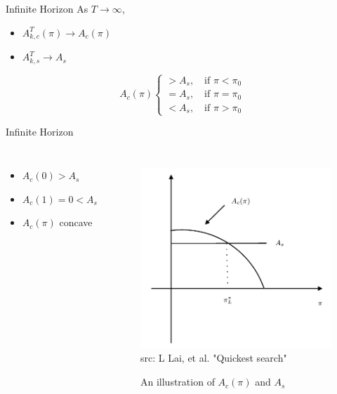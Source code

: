 \documentclass[xcolor={svgnames}]{beamer}
\begin{document}
\begin{frame}{Infinite Horizon}
  As $T\to \infty$,
  \begin{itemize}
    \item $A^T_{k,c}(\pi) \to A_c(\pi)$
    \item $A^T_{k,s} \to A_s$
  \end{itemize}

  \begin{lemma}\label{acas}
    \begin{equation}
      A_c(\pi)
      \begin{cases}
        > A_s, \quad \text{if } \pi < \pi_0 \\
        = A_s, \quad \text{if } \pi = \pi_0 \\
        < A_s, \quad \text{if } \pi > \pi_0
      \end{cases}
    \end{equation}
  \end{lemma}
\end{frame}
\begin{frame}{Infinite Horizon}
  \begin{columns}
    \begin{itemize}
      \item $A_c(0) > A_s$
      \item $A_c(1) = 0 < A_s$
      \item $A_c(\pi)$ concave
    \end{itemize}
    \pause

    \begin{figure}
        \centering
        \includegraphics[width=1.0\textwidth]{fig2}\\[-8pt]
        {\tiny src: L Lai, et al. "Quickest search"}
        \caption{An illustration of $A_c(\pi)$ and $A_s$}
        \label{fig2}
    \end{figure}
  \end{columns}
\end{frame}
\end{document}
